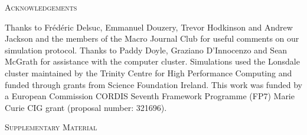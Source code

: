\documentclass[12pt,letterpaper]{article}
\renewcommand{\section}[1]{%
\bigskip
\begin{center}
\begin{Large}
\normalfont\scshape #1
\medskip
\end{Large}
\end{center}}
\begin{document}
%
%


\section{Acknowledgements}
Thanks to Frédéric Delsuc, Emmanuel Douzery, Trevor Hodkinson and Andrew Jackson and the members of the Macro Journal Club %
for useful comments on our simulation protocol. Thanks to Paddy Doyle, Graziano D'Innocenzo and Sean McGrath for assistance with the computer cluster. Simulations used the Lonsdale cluster maintained by the Trinity Centre for High Performance Computing and funded through grants from Science Foundation Ireland. %
This work was funded by a European Commission CORDIS Seventh Framework Programme (FP7) Marie Curie CIG grant (proposal number: 321696).



\section{Supplementary Material}
    
    \label{SupplementaryMaterial}


\end{document}
